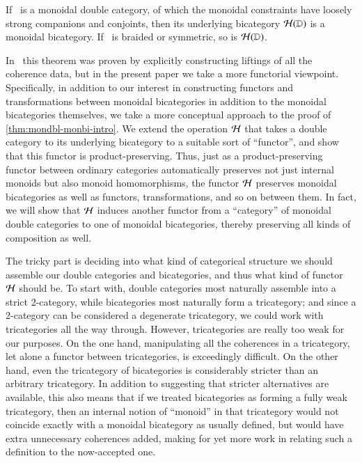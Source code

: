 \begin{thm}\label{thm:mondbl-monbi-intro}
  If \lD\ is a monoidal double category, of which the monoidal constraints have loosely strong companions and conjoints, then its underlying bicategory $\mathcal{H}(\mathbb{D})$ is a monoidal bicategory.  If \lD\ is braided
  or symmetric, so is $\mathcal{H}(\mathbb{D})$.
\end{thm}

In~\cite{shulman:smbicat} this theorem was proven by explicitly constructing liftings of all the coherence data, but in the present paper we take a more functorial viewpoint.
Specifically, in addition to our interest in constructing functors and transformations between monoidal bicategories in addition to the monoidal bicategories themselves, we take a more conceptual approach to the proof of \cref{thm:mondbl-monbi-intro}.
We extend the operation $\mathcal{H}$ that takes a double category to its underlying bicategory to a suitable sort of ``functor'', and show that this functor is product-preserving.
Thus, just as a product-preserving functor between ordinary categories automatically preserves not just internal monoids but also monoid homomorphisms, the functor $\mathcal{H}$ preserves monoidal bicategories as well as functors, transformations, and so on between them.
In fact, we will show that $\mathcal{H}$ induces another functor from a ``category'' of monoidal double categories to one of monoidal bicategories, thereby preserving all kinds of composition as well.

The tricky part is deciding into what kind of categorical structure we should assemble our double categories and bicategories, and thus what kind of functor $\mathcal{H}$ should be.
To start with, double categories most naturally assemble into a strict 2-category, while bicategories most naturally form a tricategory; and since a 2-category can be considered a degenerate tricategory, we could work with tricategories all the way through.
However, tricategories are really too weak for our purposes.
On the one hand, manipulating all the coherences in a tricategory, let alone a functor between tricategories, is exceedingly difficult.
On the other hand, even the tricategory of bicategories is considerably stricter than an arbitrary tricategory.
In addition to suggesting that stricter alternatives are available, this also means that if we treated bicategories as forming a fully weak tricategory, then an internal notion of ``monoid'' in that tricategory would not coincide exactly with a monoidal bicategory as usually defined, but would have extra unnecessary coherences added, making for yet more work in relating such a definition to the now-accepted one.

